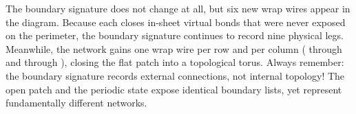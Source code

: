  The boundary signature does not change at all, but six
new wrap wires appear in the diagram.  Because each  closes
in-sheet virtual bonds that were never exposed on the perimeter, the boundary
signature continues to record nine physical legs.  Meanwhile, the network gains
one wrap wire per row and per column ( through  and
 through ), closing the flat patch into a
topological torus.  Always remember: the boundary signature records external
connections, not internal topology!  The open patch and the periodic state
expose identical boundary lists, yet represent fundamentally different networks.

\begin{tnexample}[
  answer={ex:tut-expectation},
  formula={\langle\psi\rvert O\lvert\psi\rangle},
  index={The ring stands halfway along the named ket--bra pairing: a
    one-site operator between the state and its conjugate.  The
    signature stays empty --- the expectation value is a scalar.},
  signature={kernel-boundary|signature=}]
\begin{tenkz}[lattice={2x2}, planes, bonds=none]
   
   
   
   
   
\end{tenkz}
\end{tnexample}
